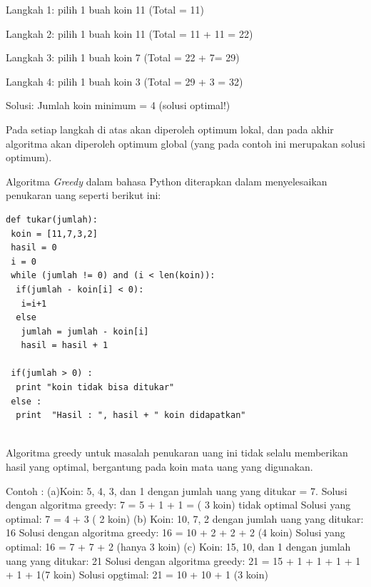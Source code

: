 Langkah 1: pilih 1 buah koin 11  (Total = 11)

Langkah 2: pilih 1 buah koin 11   (Total = 11 + 11 = 22)
	
Langkah 3: pilih 1 buah koin 7  (Total = 22 + 7= 29)  

Langkah 4: pilih 1 buah koin 3  (Total = 29 + 3 = 32)  

Solusi: Jumlah koin minimum = 4 (solusi optimal!)

Pada setiap langkah di atas akan diperoleh optimum lokal, dan pada akhir algoritma akan diperoleh optimum global (yang pada contoh ini merupakan solusi optimum).

Algoritma \textit{Greedy} dalam bahasa Python diterapkan dalam menyelesaikan penukaran uang seperti berikut ini:

\lstset{language=Python}
\label{lst:CoinchangeProblem}
\begin{lstlisting}[frame=single]
def tukar(jumlah):
 koin = [11,7,3,2]
 hasil = 0 
 i = 0
 while (jumlah != 0) and (i < len(koin)):
  if(jumlah - koin[i] < 0):
   i=i+1
  else
   jumlah = jumlah - koin[i]
   hasil = hasil + 1
			
 if(jumlah > 0) :  
  print "koin tidak bisa ditukar"
 else :
  print  "Hasil : ", hasil + " koin didapatkan"
	
\end{lstlisting}

Algoritma greedy untuk masalah penukaran uang ini  tidak selalu memberikan hasil yang optimal, bergantung pada koin mata uang yang digunakan. 
\begin{flushleft}
Contoh :\break
\break
(a)Koin: 5, 4, 3, dan 1 dengan jumlah uang yang ditukar = 7.
\break
Solusi dengan algoritma greedy: 7 = 5 + 1 + 1		=	( 3 koin)  tidak optimal
\break
Solusi yang optimal: 7 = 4 + 3	( 2 koin)
\break
\break
(b)  Koin: 10, 7, 2 dengan jumlah uang yang ditukar: 16
\break
Solusi dengan algoritma greedy: 16 = 10 + 2 + 2 + 2 (4 koin)
\break
Solusi yang optimal: 16 = 7 + 7 + 2	(hanya 3 koin)
\break
\break
(c) Koin: 15, 10, dan 1 dengan jumlah uang yang ditukar: 21
\break
Solusi dengan algoritma greedy: 21 = 15 + 1 + 1 + 1 + 1 + 1	+ 1(7 koin)
\break
Solusi opgtimal: 21 = 10 + 10	+ 1	(3 koin)
\break
\end{flushleft}

